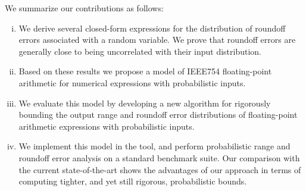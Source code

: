 We summarize our contributions as follows:
\begin{enumerate}[(i)]
\item We derive several closed-form expressions for the distribution of roundoff errors associated with a random variable.  We prove that roundoff errors are generally close to being uncorrelated with their input distribution.
\item Based on these results we propose a model of IEEE754 floating-point arithmetic for numerical expressions with probabilistic inputs.
\item We evaluate this model by developing a new algorithm for rigorously bounding the output range and roundoff error distributions of floating-point arithmetic expressions with probabilistic inputs.
\item We implement this model in the \Tool tool, and perform probabilistic range and roundoff error analysis on a standard benchmark suite. Our comparison
	with the current state-of-the-art shows the advantages of our approach in terms of computing tighter, and yet still rigorous,
	probabilistic bounds.
\end{enumerate}

